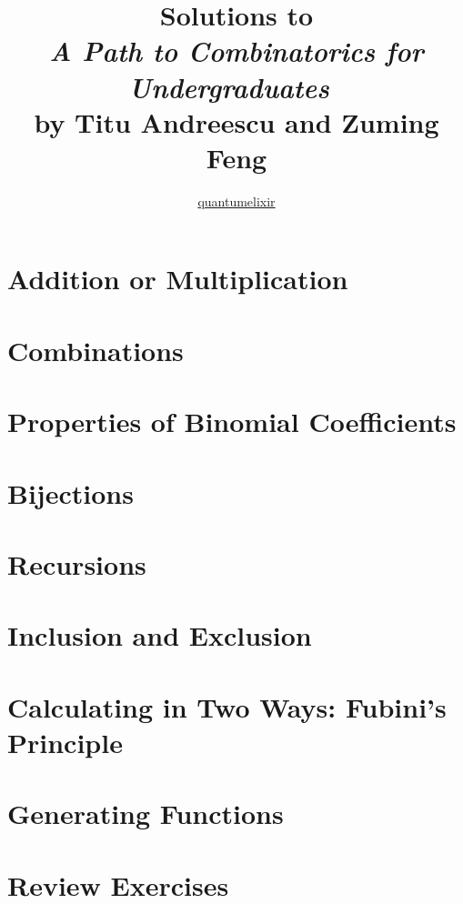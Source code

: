 \documentclass{book}
\begin{document}
\title{Solutions to \\
\emph{A Path to Combinatorics for Undergraduates~\cite{andreescu2004path}} \\
by Titu Andreescu and Zuming Feng}
\author{\href{http://profiles.google.com/quantumelixir}{quantumelixir}}
\maketitle

\tableofcontents

\chapter{Addition or Multiplication}
\chapter{Combinations}
\chapter{Properties of Binomial Coefficients}
\chapter{Bijections}
\chapter{Recursions}
\chapter{Inclusion and Exclusion}
\chapter{Calculating in Two Ways: Fubini's Principle}
\chapter{Generating Functions}
\chapter{Review Exercises}



\end{document}
